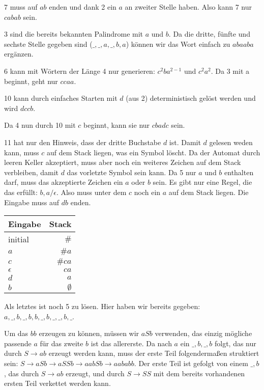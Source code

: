 \documentclass{article}
\begin{document}
\bigskip

7 muss auf $ab$ enden und dank 2 ein $a$ an zweiter Stelle haben. Also kann 7 nur $cabab$ sein.

\bigskip

3 sind die bereits bekannten Palindrome mit $a$ und $b$. Da die dritte, fünfte und sechste Stelle gegeben sind ($\_,\_,a,\_,b,a$) können wir das Wort einfach zu $abaaba$ ergänzen.

\bigskip

6 kann mit Wörtern der Länge 4 nur generieren: $c^2ba^{2-1}$ und $c^2a^2$. Da 3 mit a beginnt, geht nur $ccaa$.

\bigskip

10 kann durch einfaches Starten mit $d$ (aus 2) deterministisch gelöst werden und wird $dccb$.

\bigskip

Da 4 nun durch 10 mit $c$ beginnt, kann sie nur $cbadc$ sein.

\bigskip

11 hat nur den Hinweis, dass der dritte Buchstabe $d$ ist. Damit $d$ gelesen weden kann, muss $c$ auf dem Stack liegen, was ein Symbol löscht. Da der Automat durch leeren Keller akzeptiert, muss aber noch ein weiteres Zeichen auf dem Stack verbleiben, damit $d$ das vorletzte Symbol sein kann. Da 5 nur $a$ und $b$ enthalten darf, muss das akzeptierte Zeichen ein $a$ oder $b$ sein. Es gibt nur eine Regel, die das erfüllt: $b,a/\epsilon$. Also muss unter dem $c$ noch ein $a$ auf dem Stack liegen. Die Eingabe muss auf $db$ enden.

\begin{table*}[h]
	\centering
		\begin{tabular}{l|r}
      Eingabe & Stack \\
      \hline
      initial & $\#$ \\
      $a$ & $\# a$ \\
      $c$ & $\# ca$ \\
      $\epsilon$ & $ca$ \\
      $d$ & $a$ \\
      $b$ & $\emptyset$
		\end{tabular}
\end{table*}

\bigskip

Als letztes ist noch 5 zu lösen. Hier haben wir bereits gegeben: \\ $a,\_,b,\_,b,b,\_,b,\_,\_,b,\_$. 

Um das $bb$ erzeugen zu können, müssen wir $aSb$ verwenden, das einzig mögliche passende $a$ für das zweite $b$ ist das allererste. Da nach $a$ ein $\_,b,\_,b$ folgt, das nur durch $S\rightarrow ab$ erzeugt werden kann, muss der erste Teil folgendermaßen struktiert sein: $S \rightarrow aSb \rightarrow aSSb \rightarrow aabSb \rightarrow aababb$.
Der erste Teil ist gefolgt von einem $\_,b$, das durch $S \rightarrow ab$ erzeugt, und durch $S \rightarrow SS$ mit dem bereits vorhandenen ersten Teil verkettet werden kann.
\end{document}
